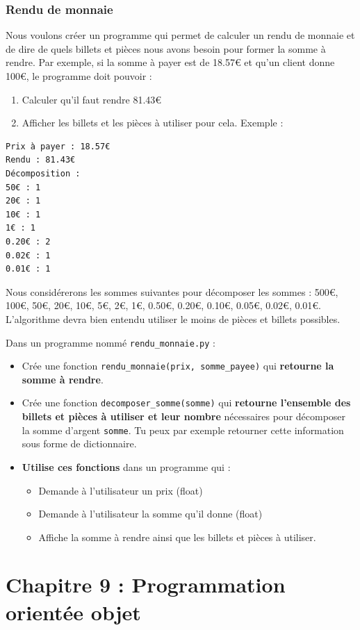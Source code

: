 \documentclass[11pt]{article}
\begin{document}
\subsubsection*{Rendu de monnaie}
\label{sec:org43f46cb}
Nous voulons créer un programme qui permet de calculer un rendu de monnaie et de dire de quels billets et pièces nous avons besoin pour former la somme à rendre. Par exemple, si la somme à payer est de 18.57€ et qu'un client donne 100€, le programme doit pouvoir :
\begin{enumerate}
\item Calculer qu'il faut rendre 81.43€
\item Afficher les billets et les pièces à utiliser pour cela. Exemple :
\end{enumerate}
\begin{verbatim}
Prix à payer : 18.57€
Rendu : 81.43€
Décomposition :
50€ : 1
20€ : 1
10€ : 1
1€ : 1
0.20€ : 2
0.02€ : 1
0.01€ : 1
\end{verbatim}
Nous considérerons les sommes suivantes pour décomposer les sommes : 500€, 100€, 50€, 20€, 10€, 5€, 2€, 1€, 0.50€, 0.20€, 0.10€, 0.05€, 0.02€, 0.01€. L'algorithme devra bien entendu utiliser le moins de pièces et billets possibles.

Dans un programme nommé \texttt{rendu\_monnaie.py} :
\begin{itemize}
\item Crée une fonction \texttt{rendu\_monnaie(prix, somme\_payee)} qui \textbf{retourne la somme à rendre}.
\item Crée une fonction \texttt{decomposer\_somme(somme)} qui \textbf{retourne l'ensemble des billets et pièces à utiliser et leur nombre} nécessaires pour décomposer la somme d'argent \texttt{somme}. Tu peux par exemple retourner cette information sous forme de dictionnaire.
\item \textbf{Utilise ces fonctions} dans un programme qui :
\begin{itemize}
\item Demande à l'utilisateur un prix (float)
\item Demande à l'utilisateur la somme qu'il donne (float)
\item Affiche la somme à rendre ainsi que les billets et pièces à utiliser.
\end{itemize}
\end{itemize}



\section*{Chapitre 9 : Programmation orientée objet}
\label{chapitre9}
\end{document}
